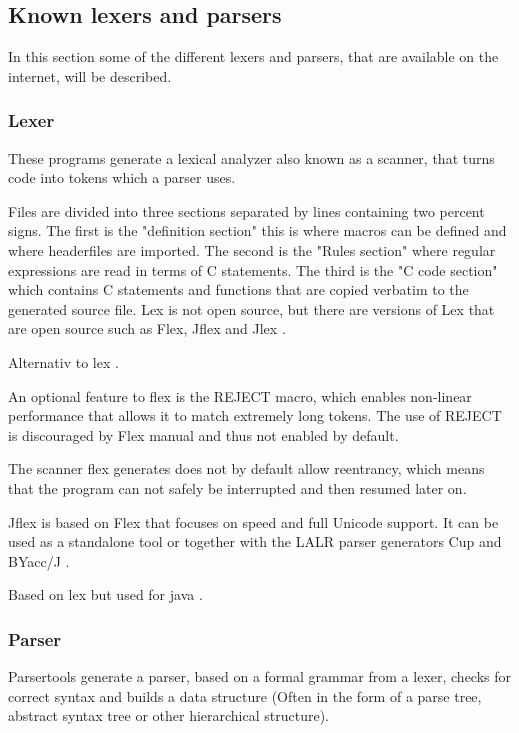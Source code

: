 \subsection{Known lexers and parsers}
\label{sec:KnownLexersAndParsers}

In this section some of the different lexers and parsers, that are available on the internet, will be described.

\subsubsection{Lexer}
These programs generate a lexical analyzer also known as a scanner, that turns code into tokens which a parser uses.

Files are divided into three sections separated by lines containing two percent signs. The first is the "definition section" this is where macros can be defined and where headerfiles are imported. The second is the "Rules section" where regular expressions are read in terms of C statements. The third is the "C code section" which contains C statements and functions that are copied verbatim to the generated source file. Lex is not open source, but there are versions of Lex that are open source such as Flex, Jflex and Jlex \citep{Lex}.

Alternativ to lex \citep{Flex}.

An optional feature to flex is the REJECT macro, which enables non-linear performance that allows it to match extremely long tokens. The use of REJECT is discouraged by Flex manual and thus not enabled by default. 

The scanner flex generates does not by default allow reentrancy, which means that the program can not safely be interrupted and then resumed later on.

Jflex is based on Flex that focuses on speed and full Unicode support. It can be used as a standalone tool or together with the LALR parser generators Cup and BYacc/J \citep{Jflex}.

Based on lex but used for java \citep{Jlex}.

\subsubsection{Parser}
Parsertools generate a parser, based on a formal grammar from a lexer, checks for correct syntax and builds a data structure (Often in the form of a parse tree, abstract syntax tree or other hierarchical structure). 


